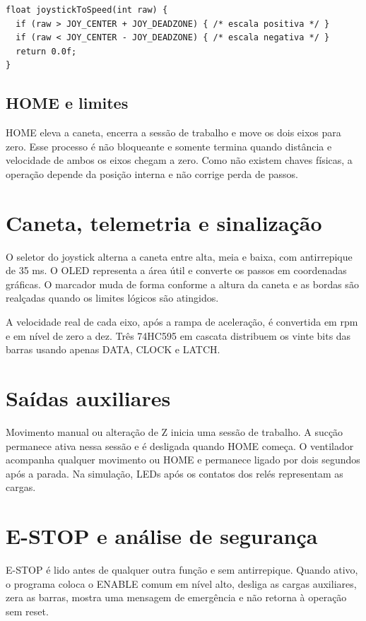 \documentclass[12pt,a4paper]{article}
\begin{document}
\begin{lstlisting}[caption={Conversão resumida da entrada analógica.}]
float joystickToSpeed(int raw) {
  if (raw > JOY_CENTER + JOY_DEADZONE) { /* escala positiva */ }
  if (raw < JOY_CENTER - JOY_DEADZONE) { /* escala negativa */ }
  return 0.0f;
}
\end{lstlisting}

\subsection{HOME e limites}

HOME eleva a caneta, encerra a sessão de trabalho e move os dois eixos para
zero. Esse processo é não bloqueante e somente termina quando distância e
velocidade de ambos os eixos chegam a zero. Como não existem chaves físicas, a
operação depende da posição interna e não corrige perda de passos.

\section{Caneta, telemetria e sinalização}

O seletor do joystick alterna a caneta entre alta, meia e baixa, com
antirrepique de 35 ms. O OLED representa a área útil e converte os passos em
coordenadas gráficas. O marcador muda de forma conforme a altura da caneta e
as bordas são realçadas quando os limites lógicos são atingidos.

A velocidade real de cada eixo, após a rampa de aceleração, é convertida em rpm
e em nível de zero a dez. Três 74HC595 em cascata distribuem os vinte bits das
barras usando apenas DATA, CLOCK e LATCH.

\section{Saídas auxiliares}

Movimento manual ou alteração de Z inicia uma sessão de trabalho. A sucção
permanece ativa nessa sessão e é desligada quando HOME começa. O ventilador
acompanha qualquer movimento ou HOME e permanece ligado por dois segundos após
a parada. Na simulação, LEDs após os contatos dos relés representam as cargas.

\section{E-STOP e análise de segurança}

E-STOP é lido antes de qualquer outra função e sem antirrepique. Quando ativo,
o programa coloca o ENABLE comum em nível alto, desliga as cargas auxiliares,
zera as barras, mostra uma mensagem de emergência e não retorna à operação sem
reset.
\end{document}
